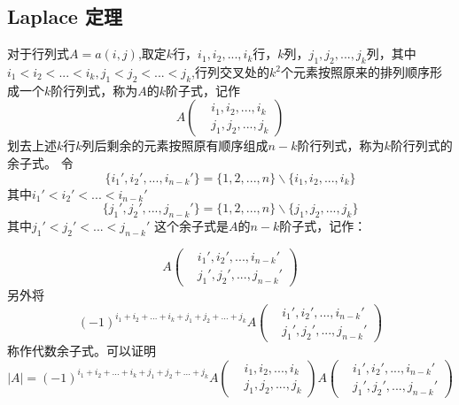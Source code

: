 \documentclass[blue,normal,cn]{elegantnote}
\begin{document}
\subsection{Laplace 定理}
\begin{theorem}[Laplace 定理]
    对于行列式$A=a(i,j)$,取定$k$行，$i_1,i_2,...,i_k$行，$k$列，$j_1,j_2,...,j_k$列，其中$i_1<i_2<...<i_k,j_1<j_2<...<j_k$,行列交叉处的$k^2$个元素按照原来的排列顺序形成一个$k$阶行列式，称为$A$的$k$阶子式，记作
    \begin{equation*}
        A\left(
            \begin{aligned}
                &i_1,i_2,...,i_k\\
                &j_1,j_2,...,j_k
            \end{aligned}
        \right)
    \end{equation*}
    划去上述$k$行$k$列后剩余的元素按照原有顺序组成$n-k$阶行列式，称为$k$阶行列式的余子式。
    令
    $$\{i_1',i_2',...,i_{n-k}'\}=\{1,2,...,n\}\backslash \{i_1,i_2,...,i_k\}$$
    其中$i_1'<i_2'<...<i_{n-k}'$
    $$\{j_1',j_2',...,j_{n-k}'\}=\{1,2,...,n\}\backslash \{j_1,j_2,...,j_k\}$$
    其中$j_1'<j_2'<...<j_{n-k}'$
    这个余子式是$A$的$n-k$阶子式，记作：
    
    \begin{equation*}
        A\left(
            \begin{aligned}
                &i_1',i_2',...,i_{n-k}'\\
                &j_1',j_2',...,j_{n-k}'
            \end{aligned}
        \right)
    \end{equation*}
    另外将
    \begin{equation*}
        (-1)^{i_1+i_2+...+i_k+j_1+j_2+...+j_k}
        A\left(
            \begin{aligned}
                &i_1',i_2',...,i_{n-k}'\\
                &j_1',j_2',...,j_{n-k}'
            \end{aligned}
        \right)
    \end{equation*}
    称作代数余子式。可以证明
    \begin{equation*}
        |A|=(-1)^{i_1+i_2+...+i_k+j_1+j_2+...+j_k}
        A\left(
            \begin{aligned}
                &i_1,i_2,...,i_k\\
                &j_1,j_2,...,j_k
            \end{aligned}
        \right)
        A\left(
            \begin{aligned}
                &i_1',i_2',...,i_{n-k}'\\
                &j_1',j_2',...,j_{n-k}'
            \end{aligned}
        \right)
    \end{equation*}
\end{theorem}
\end{document}

